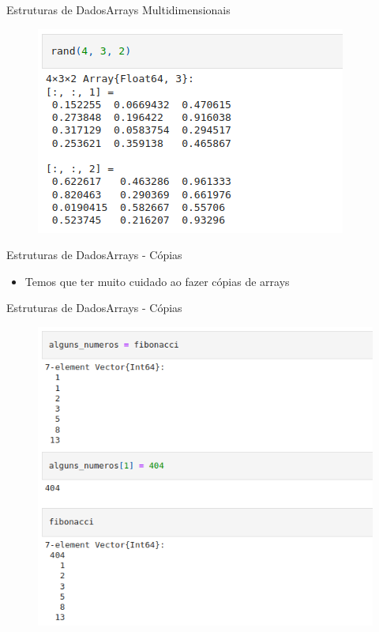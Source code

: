 \documentclass{beamer}
\begin{document}
\begin{frame}{Estruturas de Dados}{Arrays Multidimensionais}
    \begin{figure}
        \centering
        \includegraphics[scale=0.5]{imagens/array11.png}
        \label{fig:my_label}
    \end{figure}
\end{frame}

\begin{frame}{Estruturas de Dados}{Arrays - Cópias}
    \begin{itemize}
        \item Temos que ter muito cuidado ao fazer cópias de arrays
    \end{itemize}
\end{frame}

\begin{frame}{Estruturas de Dados}{Arrays - Cópias}
    \begin{figure}
        \centering
        \includegraphics[scale=0.4]{imagens/array12.png}
        \label{fig:my_label}
    \end{figure}
\end{frame}
\end{document}
